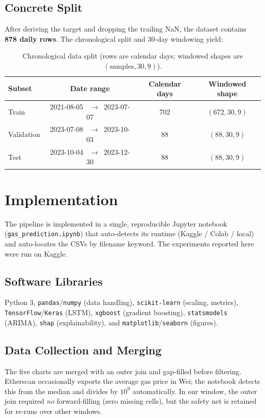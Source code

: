 \documentclass[11pt,a4paper]{article}
\begin{document}
\subsection{Concrete Split}
After deriving the target and dropping the trailing NaN, the dataset contains \textbf{878 daily
rows}. The chronological split and 30-day windowing yield:
\begin{table}[h]
\centering
\caption{Chronological data split (rows are calendar days; windowed shapes are $(\text{samples},30,9)$).}
\label{tab:split}
\small
\begin{tabular}{@{}lccc@{}}
\toprule
\textbf{Subset} & \textbf{Date range} & \textbf{Calendar days} & \textbf{Windowed shape} \\
\midrule
Train      & 2021-08-05 \ $\to$\ 2023-07-07 & 702 & $(672,30,9)$ \\
Validation & 2023-07-08 \ $\to$\ 2023-10-03 & 88  & $(88,30,9)$ \\
Test       & 2023-10-04 \ $\to$\ 2023-12-30 & 88  & $(88,30,9)$ \\
\bottomrule
\end{tabular}
\end{table}

\section{Implementation}
The pipeline is implemented in a single, reproducible Jupyter notebook
(\texttt{gas\_prediction.ipynb}) that auto-detects its runtime (Kaggle / Colab / local) and
auto-locates the CSVs by filename keyword. The experiments reported here were run on Kaggle.

\subsection{Software Libraries}
Python 3, \texttt{pandas}/\texttt{numpy} (data handling), \texttt{scikit-learn} (scaling,
metrics), \texttt{TensorFlow}/\texttt{Keras} (LSTM), \texttt{xgboost} (gradient boosting),
\texttt{statsmodels} (ARIMA), \texttt{shap} (explainability), and
\texttt{matplotlib}/\texttt{seaborn} (figures).

\subsection{Data Collection and Merging}
The five charts are merged with an outer join and gap-filled before filtering. Etherscan
occasionally exports the average gas price in Wei; the notebook detects this from the median and
divides by $10^9$ automatically. In our window, the outer join required \emph{no} forward-filling
(zero missing cells), but the safety net is retained for re-runs over other windows.
\end{document}
